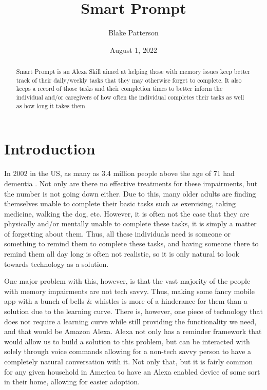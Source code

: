 \documentclass[11pt, oneside]{article}
\begin{document}
\title{Smart Prompt}
\author{Blake Patterson}
\date{August 1, 2022}
\maketitle

\begin{abstract}
Smart Prompt is an Alexa Skill aimed at helping those with memory issues keep better track of their daily/weekly tasks that they may otherwise forget to complete. 
It also keeps a record of those tasks and their completion times to better inform the individual and/or caregivers of how often the individual completes their tasks as well as how long it takes them. 
\end{abstract}

\newpage
\tableofcontents
\newpage
{}


\section{Introduction}

In 2002 in the US, as many as 3.4 million people above the age of 71 had dementia \cite{b4}. 
Not only are there no effective treatments for these impairments, but the number is not going down either. 
Due to this, many older adults are finding themselves unable to complete their basic tasks such as exercising, taking medicine, walking the dog, etc.
However, it is often not the case that they are physically and/or mentally unable to complete these tasks, it is simply a matter of forgetting about them. 
Thus, all these individuals need is someone or something to remind them to complete these tasks, and having someone there to remind them all day long is often not realistic, so it is only natural to look towards technology as a solution. 

One major problem with this, however, is that the vast majority of the people with memory impairments are not tech savvy. 
Thus, making some fancy mobile app with a bunch of bells \& whistles is more of a hinderance for them than a solution due to the learning curve. 
There is, however, one piece of technology that does not require a learning curve while still providing the functionality we need, and that would be Amazon Alexa. 
Alexa not only has a reminder framework that would allow us to build a solution to this problem, but can be interacted with solely through voice commands allowing for a non-tech savvy person to have a completely natural conversation with it. 
Not only that, but it is fairly common for any given household in America to have an Alexa enabled device of some sort in their home, allowing for easier adoption. 
\end{document}

